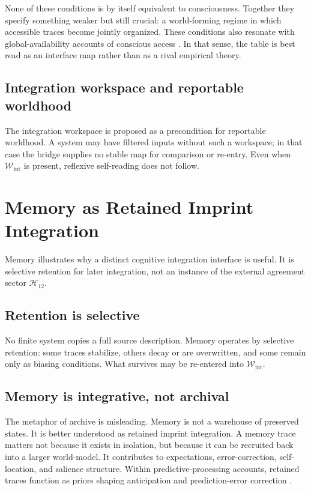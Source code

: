 \documentclass[12pt,a4paper]{article}
\begin{document}
None of these conditions is by itself equivalent to consciousness. Together they specify something weaker but still crucial: a world-forming regime in which accessible traces become jointly organized. These conditions also resonate with global-availability accounts of conscious access \cite{Baars1988,DehaeneChangeux2011}. In that sense, the table is best read as an interface map rather than as a rival empirical theory.

\subsection{Integration workspace and reportable worldhood}

The integration workspace is proposed as a precondition for reportable
worldhood. A system may have filtered inputs without such a workspace;
in that case the bridge supplies no stable map for comparison or
re-entry. Even when \(\mathcal W_{\mathrm{int}}\) is present, reflexive
self-reading does not follow.

\section{Memory as Retained Imprint Integration}

Memory illustrates why a distinct cognitive integration interface is
useful. It is selective retention for later integration, not an instance
of the external agreement sector \(\mathcal H_{12}\).

\subsection{Retention is selective}

No finite system copies a full source description. Memory operates by
selective retention: some traces stabilize, others decay or are
overwritten, and some remain only as biasing conditions. What survives
may be re-entered into \(\mathcal W_{\mathrm{int}}\).

\subsection{Memory is integrative, not archival}

The metaphor of archive is misleading. Memory is not a warehouse of preserved states. It is better understood as retained imprint integration. A memory trace matters not because it exists in isolation, but because it can be recruited back into a larger world-model. It contributes to expectations, error-correction, self-location, and salience structure. Within predictive-processing accounts, retained traces function as priors shaping anticipation and prediction-error correction \cite{Clark2013}.
\end{document}
